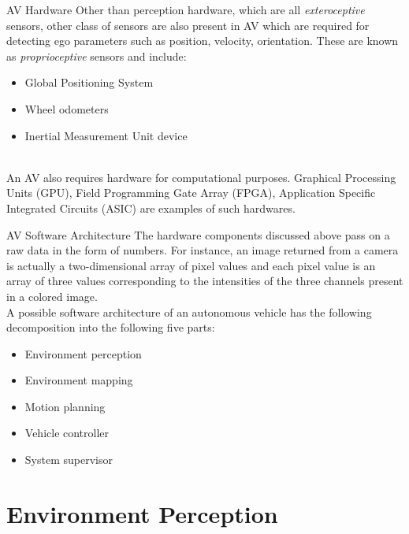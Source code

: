 \documentclass{beamer}
\begin{document}
\begin{frame}{AV Hardware}
    Other than perception hardware, which are all \textit{exteroceptive} sensors, other class of sensors are also present in AV which are required for detecting ego parameters such as position, velocity, orientation. These are known as \textit{proprioceptive} sensors and include:
    \begin{itemize}
        \item Global Positioning System
        \item Wheel odometers
        \item Inertial Measurement Unit device\\~\\
    \end{itemize}
    An AV also requires hardware for computational purposes. Graphical Processing Units (GPU), Field Programming Gate Array (FPGA), Application Specific Integrated Circuits (ASIC) are examples of such hardwares.
\end{frame}

\begin{frame}{AV Software Architecture}
    The hardware components discussed above pass on a raw data in the form of numbers.  For instance, an image returned from a camera is actually a two-dimensional array of pixel values and each pixel value is an array of three values corresponding to the intensities of the three channels present in a colored image.\\
    
     A possible software architecture of an autonomous vehicle has the following decomposition into the following five parts:
     \begin{itemize}
         \item Environment perception
         \item Environment mapping
         \item Motion planning
         \item Vehicle controller
         \item System supervisor
     \end{itemize}
\end{frame}


\section{Environment Perception}
\end{document}
